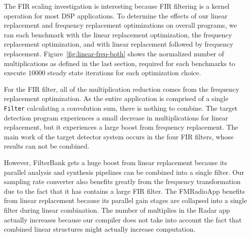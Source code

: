 The FIR scaling investigation is interesting because FIR filtering is a kernel
operation for most DSP applications. To determine the effects of our linear
replacement and frequency replacement optimizations on overall programs, we ran
each benchmark with the linear replacement optimization, the frequency replacement
optimization, and with linear replacement followed by frequency replacement. 
Figure~\ref{fig:linear-freq-both} shows the normalized number of 
multiplications as defined in the last section, required for each 
benchmarks to execute $10000$ steady state iterations for each optimization choice.

For the FIR filter, all of the multiplication reduction comes from the frequency
replacement optimization. As the entire application is comprised of a single
{\tt Filter} calculating a convolution sum, there is nothing to combine.
The target detection program experiences a small decrease in multiplications 
for linear replacement, but it experiences a large boost from frequency replacement.
The main work of the target detector system occurs in the four FIR filters, whose
results can not be combined.

However, FilterBank gets a huge boost from linear replacement because its
parallel analysis and synthesis pipelines can be combined into a single filter.
Our sampling rate converter also benefits greatly from the frequency transformation
due to the fact that it has contains a large FIR filter. The FMRadioApp
benefits from linear replacement because its parallel gain stages are collapsed
into a single filter during linear combination. The number of multiplies in the
Radar app actually increases because our compiler does not take into account the
fact that combined linear structures might actually increase computation.
